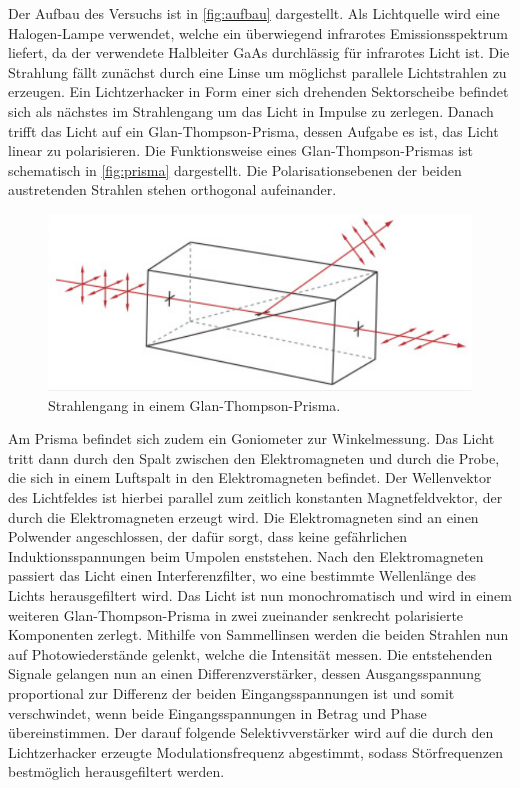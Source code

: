 Der Aufbau des Versuchs ist in \autoref{fig:aufbau} dargestellt.
Als Lichtquelle wird eine Halogen-Lampe verwendet, welche ein überwiegend infrarotes Emissionsspektrum liefert, da der verwendete Halbleiter
GaAs durchlässig für infrarotes Licht ist.
Die Strahlung fällt zunächst durch eine Linse um möglichst parallele Lichtstrahlen zu erzeugen.
Ein Lichtzerhacker in Form einer sich drehenden Sektorscheibe befindet sich als nächstes im Strahlengang um das Licht in Impulse zu zerlegen.
Danach trifft das Licht auf ein Glan-Thompson-Prisma, dessen Aufgabe es ist, das Licht linear zu polarisieren.
Die Funktionsweise eines Glan-Thompson-Prismas ist schematisch in \autoref{fig:prisma} dargestellt. Die Polarisationsebenen der beiden
austretenden Strahlen stehen orthogonal aufeinander.
\begin{figure}[H]
    \centering
    \includegraphics[scale=0.35]{Abbildungen/prisma.png}
    \caption{Strahlengang in einem Glan-Thompson-Prisma.\cite{Prisma}}
    \label{fig:prisma}
\end{figure}
Am Prisma befindet sich zudem ein Goniometer zur Winkelmessung.
Das Licht tritt dann durch den Spalt zwischen den Elektromagneten und durch die Probe, die sich in einem Luftspalt in den Elektromagneten
befindet.
Der Wellenvektor des Lichtfeldes ist hierbei parallel zum zeitlich konstanten Magnetfeldvektor, der durch die Elektromagneten erzeugt wird.
Die Elektromagneten sind an einen Polwender angeschlossen, der dafür sorgt, dass keine gefährlichen Induktionsspannungen beim Umpolen enststehen.
Nach den Elektromagneten passiert das Licht einen Interferenzfilter, wo eine bestimmte Wellenlänge des Lichts herausgefiltert wird.
Das Licht ist nun monochromatisch und wird in einem weiteren Glan-Thompson-Prisma in
zwei zueinander senkrecht polarisierte Komponenten zerlegt.
Mithilfe von Sammellinsen werden die beiden Strahlen nun auf Photowiederstände gelenkt, welche die Intensität messen.
Die entstehenden Signale gelangen nun an einen Differenzverstärker, dessen Ausgangsspannung proportional zur Differenz der beiden Eingangsspannungen
ist und somit verschwindet, wenn beide Eingangsspannungen in Betrag und Phase übereinstimmen.
Der darauf folgende Selektivverstärker wird auf die durch den Lichtzerhacker erzeugte
Modulationsfrequenz abgestimmt, sodass Störfrequenzen bestmöglich herausgefiltert werden.

